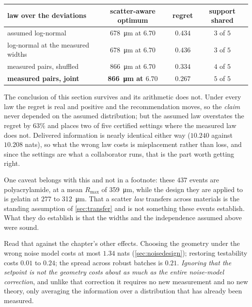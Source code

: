\documentclass[10pt]{article}
\begin{document}
\begin{center}
\begin{tabular}{lccc}
\toprule
law over the deviations & scatter-aware optimum & regret & support shared \\
\midrule
assumed log-normal & \SI{678}{\micro\metre} at $6.70$ & $0.434$ & $3$ of $5$ \\
log-normal at the measured widths & \SI{678}{\micro\metre} at $6.70$ & $0.436$ & $3$ of $5$ \\
measured pairs, shuffled & \SI{866}{\micro\metre} at $6.70$ & $0.334$ & $4$ of $5$ \\
\textbf{measured pairs, joint} & \textbf{\SI{866}{\micro\metre} at $6.70$} & $\mathbf{0.267}$ & $5$ of $5$ \\
\bottomrule
\end{tabular}
\end{center}

\noindent The conclusion of this section survives and its arithmetic does not. Under every law
the regret is real and positive and the recommendation moves, so the \emph{claim} never depended
on the assumed distribution; but the assumed law overstates the regret by $63\%$ and places two
of five certified settings where the measured law does not. Delivered information is nearly
identical either way ($10.240$ against $10.208$ nats), so what the wrong law costs is
misplacement rather than loss, and since the settings are what a collaborator runs, that is
the part worth getting right.

One caveat belongs with this and not in a footnote: these $437$ events are polyacrylamide, at a
mean $R_{\max}$ of \SI{359}{\micro\metre}, while the design they are applied to is gelatin at
$277$ to \SI{312}{\micro\metre}. That a scatter \emph{law} transfers across materials is the
standing assumption of \cref{sec:transfer} and is not something these events establish. What
they do establish is that the widths and the independence assumed above were sound.

Read that against the chapter's other effects. Choosing the geometry under the wrong noise model
costs at most $1.34$ nats (\cref{sec:noisedesign}); restoring testability costs $0.01$ to $0.24$;
the spread across robust batches is $0.21$. \emph{Ignoring that the setpoint is not the geometry
costs about as much as the entire noise-model correction}, and unlike that correction it requires
no new measurement and no new theory, only averaging the information over a distribution that
has already been measured.
\end{document}
